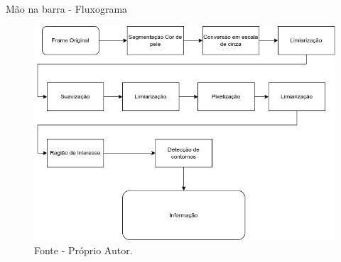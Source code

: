 \begin{frame}{Mão na barra - Fluxograma}
    \begin{figure}[!ht]
    \centering
    \includegraphics[scale=0.4]{img/desenvolvimento/maoBarra/fluxograma.png}
    \caption*{Fonte - Próprio Autor.}
    \end{figure}
\end{frame}


